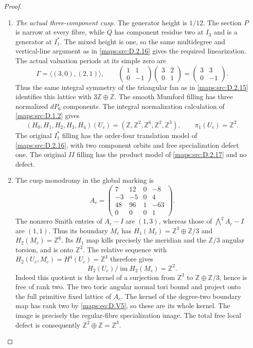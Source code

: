 \begin{proof}
\begin{enumerate}[label=\arabic*.,leftmargin=*]
\item \emph{The actual three-component cusp.}
The generator height is $1/12$. The section $P$ is narrow
at every fibre, while $Q$ has component residue two at
$I_3$ and is a generator at $I_1^*$. The mixed height is
one, so the same multidegree and vertical-line argument
as in \ref{maps:src:D.2.16} gives the required linearization.
The actual valuation periods at its simple zero are
\[
 \Gamma=\langle(3,0),(2,1)\rangle,
 \qquad
 \begin{pmatrix}1&1\\0&-1\end{pmatrix}
 \begin{pmatrix}3&2\\0&1\end{pmatrix}
       =\begin{pmatrix}3&3\\0&-1\end{pmatrix}.
 \tag{D.V4}\label{maps:eq:D.V4}
\]
Thus the same integral symmetry of the triangular fan as
in \ref{maps:src:D.2.15} identifies this lattice with
$3\mathbb Z\oplus\mathbb Z$. The smooth Mumford filling
has three normalized $dP_6$ components. The integral
normalization calculation of \ref{maps:src:D.1.2} gives
\[
 (H_0,H_1,H_2,H_3,H_4)(U_c)
  =(\mathbb Z,\mathbb Z^2,\mathbb Z^6,\mathbb Z^2,\mathbb Z^3),
 \qquad \pi_1(U_c)=\mathbb Z^2.
\]
The original $I_1^*$ filling has the order-four translation
model of \ref{maps:src:D.2.16}, with two component orbits and free
specialization defect one. The original $II$ filling has
the product model of \ref{maps:src:D.2.17} and no defect.

\item The cusp monodromy in the global marking is
\[
 A_c=\begin{pmatrix}
 7&12&0&-8\\-3&-5&0&4\\48&96&1&-63\\0&0&0&1
 \end{pmatrix}.
\]
The nonzero Smith entries of $A_c-I$ are $(1,3)$,
whereas those of $\bigwedge^2A_c-I$ are $(1,1)$.
Thus its boundary $M_c$ has
$H_1(M_c)=\mathbb Z^3\oplus\mathbb Z/3$ and
$H_2(M_c)=\mathbb Z^6$.
Its $H_1$ map kills precisely the meridian and the
$\mathbb Z/3$ angular torsion, and is onto $\mathbb Z^2$.
The relative sequence with
$H_2(U_c,M_c)=H^4(U_c)=\mathbb Z^3$ therefore gives
\[
 H_2(U_c)/\operatorname{im}H_2(M_c)=\mathbb Z^2.
 \tag{D.V5}\label{maps:eq:D.V5}
\]
Indeed this quotient is the kernel of a surjection from
$\mathbb Z^3$ to $\mathbb Z\oplus\mathbb Z/3$, hence is
free of rank two. The two toric angular normal tori bound
and project onto the full primitive fixed lattice of
$A_c$. The kernel of the degree-two boundary map has
rank two by \eqref{maps:eq:D.V5}, so these are its whole kernel.
The image is precisely the regular-fibre specialization
image. The total free local defect is consequently
$\mathbb Z^2\oplus\mathbb Z=\mathbb Z^3$.


\end{enumerate}
\end{proof}
